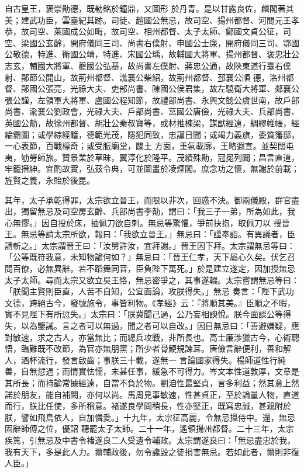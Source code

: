 \begin{pinyinscope}
 自古皇王，褒崇勛德，既勒銘於鐘鼎，又圖形
 於丹青。是以甘露良佐，麟閣著其美；建武功臣，雲臺紀其跡。司徒、趙國公無忌，故司空、揚州都督、河間元王孝恭，故司空、萊國成公如晦，故司空、相州都督、太子太師、鄭國文貞公征，司空、梁國公玄齡，開府儀同三司、尚書右僕射、申國公士廉，開府儀同三司、鄂國公敬德，特進、衛國公靖，特進、宋國公瑀，故輔國大將軍、揚州都督、褒忠壯公志玄，輔國大將軍、夔國公弘基，故尚書左僕射、蔣忠公通，故陜東道行臺右僕射、鄖節公開山，故荊州都督、譙襄公柴紹，故荊州都督、邳襄公順
 德，洛州都督、鄖國公張亮，光祿大夫、吏部尚書、陳國公侯君集，故左驍衛大將軍、郯襄公張公謹，左領軍大將軍、盧國公程知節，故禮部尚書、永興文懿公虞世南，故戶部尚書、渝襄公劉政會，光祿大夫、戶部尚書、莒國公唐儉，光祿大夫、兵部尚書、英國公勣，故徐州都督、胡壯公秦叔寶等，或材推棟梁，謀猷經遠，綢繆帷帳，經綸霸圖；或學綜經籍，德範光茂，隱犯同致，忠讜日聞；或竭力義旗，委質籓邸，一心表節，百戰標奇；或受脤廟堂，闢土
 方面，重氛載廓，王略遐宣。並契闊屯夷，劬勞師旅。贊景業於草昧，翼淳化於隆平。茂績殊勛，冠冕列闢；昌言直道，牢籠搢紳。宜酌故實，弘茲令典，可並圖畫於凌煙閣。庶念功之懷，無謝於前載；旌賢之義，永貽於後昆。



 其年，太子承乾得罪，太宗欲立晉王，而限以非次，回惑不決。御兩儀殿，群官盡出，獨留無忌及司空房玄齡、兵部尚書李勣，謂曰：「我三子一弟，所為如此，我心無憀。」因自投於床，抽佩刀欲自刺。無忌等驚懼，爭前扶抱，取佩刀以
 授晉王。無忌等請太宗所欲，報曰：「我欲立晉王。」無忌曰：「謹奉詔。有異議者，臣請斬之。」太宗謂晉王曰：「汝舅許汝，宜拜謝。」晉王因下拜。太宗謂無忌等曰：「公等既符我意，未知物論何如？」無忌曰：「晉王仁孝，天下屬心久矣。伏乞召問百僚，必無異辭。若不蹈舞同音，臣負陛下萬死。」於是建立遂定，因加授無忌太子太師。尋而太宗又欲立吳王恪，無忌密爭之，其事遂輟。太宗嘗謂無忌等曰：「朕聞主賢則臣直，人苦不自知，公宜面論，攻朕得失。」無忌
 奏言：「陛下武功文德，跨絕古今，發號施令，事皆利物。《孝經》云：『將順其美。』臣順之不暇，實不見陛下有所愆失。」太宗曰：「朕冀聞己過，公乃妄相諛悅。朕今面談公等得失，以為鑒誡。言之者可以無過，聞之者可以自改。」因目無忌曰：「善避嫌疑，應對敏速，求之古人，亦當無比；而總兵攻戰，非所長也。高士廉涉獵古今，心術聰悟，臨難既不改節，為官亦無朋黨；所少者骨鯁規諫耳。唐儉言辭便利，善和解人，酒杯流行，發言啟齒；事朕三十載，遂無一
 言論國家得失。楊師道性行純善，自無愆過；而情實怯懦，未甚任事，緩急不可得力。岑文本性道敦厚，文章是其所長；而持論常據經遠，自當不負於物。劉洎性最堅貞，言多利益；然其意上然諾於朋友，能自補闕，亦何以尚。馬周見事敏速，性甚貞正，至於論量人物，直道而行，朕比任使，多所稱意。褚遂良學問稍長，性亦堅正，既寫忠誠，甚親附於朕，譬如飛鳥依人，自加憐愛。」十九年，太宗征高麗，令無忌攝侍中。還，無忌固辭師傅之位，優詔
 聽罷太子太師。二十一年，遙領揚州都督。二十三年，太宗疾篤，引無忌及中書令褚遂良二人受遺令輔政。太宗謂遂良曰：「無忌盡忠於我，我有天下，多是此人力。爾輔政後，勿令讒毀之徒損害無忌。若如此者，爾則非復人臣。」




\end{pinyinscope}
